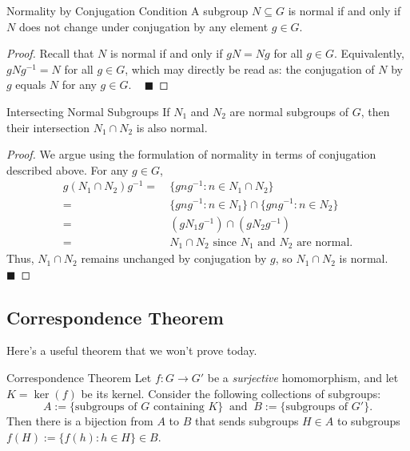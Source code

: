 \begin{theorem}{Normality by Conjugation Condition}
    A subgroup $N \subseteq G$ is normal if and only if $N$ does not change under conjugation by any element $g \in G$.
\end{theorem}

\begin{proof}
    Recall that $N$ is normal if and only if $gN = Ng$ for all $g \in G$.  Equivalently, $gNg^{-1} = N$ for all $g \in G$, which may directly be read as: the conjugation of $N$ by $g$ equals $N$ for any $g \in G$.  ~ $\blacksquare$
\end{proof}

\begin{theorem}{Intersecting Normal Subgroups}
    If $N_1$ and $N_2$ are normal subgroups of $G$, then their intersection $N_1 \cap N_2$ is also normal.
\end{theorem}

\begin{proof}
    We argue using the formulation of normality in terms of conjugation described above.  For any $g \in G$,
    \begin{align*} g(N_1 \cap N_2)g^{-1} = \ & \{gng^{-1} : n \in N_1 \cap N_2\} \\ = \ & \{gng^{-1} : n \in N_1\} \cap \{gng^{-1}: n \in N_2\} \\
    = \ & (gN_1g^{-1}) \cap (gN_2g^{-1}) \\
    = \ & N_1 \cap N_2 \text{ since } N_1 \text{ and } N_2 \text{ are normal.} \end{align*}
    Thus, $N_1 \cap N_2$ remains unchanged by conjugation by $g$, so $N_1 \cap N_2$ is normal. ~ $\blacksquare$
\end{proof}

\subsection{Correspondence Theorem}

Here's a useful theorem that we won't prove today.

\begin{theorem}{Correspondence Theorem}
    Let $f: G \to G'$ be a \emph{surjective} homomorphism, and let $K = \ker(f)$ be its kernel.  Consider the following collections of subgroups:
    \[ A := \{\text{subgroups of } G \text{ containing } K\} ~ \text{ and } ~ B := \{\text{subgroups of } G'\}. \]
    Then there is a bijection from $A$ to $B$ that sends subgroups $H \in A$ to subgroups $f(H) := \{f(h): h \in H\} \in B$.
\end{theorem}

